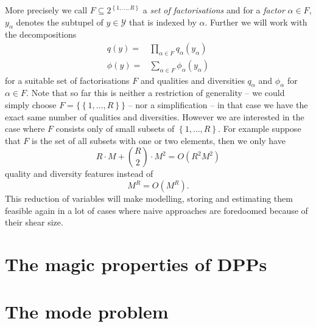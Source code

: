 More precisely we call \(F\subseteq 2^{\left\{ 1, \dots, R\right\}}\) a \emph{set of factorisations} and for a \emph{factor} \(\alpha\in F\), \(y_\alpha\) denotes the subtupel of \(y\in\mathcal Y\) that is indexed by \(\alpha\). Further we will work with the decompositions
\begin{equation}
\begin{split}
q(y) = & \prod_{\alpha\in F}q_\alpha(y_\alpha) \\
\phi(y) = & \sum_{\alpha\in F} \phi_\alpha(y_\alpha)
\end{split}
\end{equation}
for a suitable set of factorisations \(F\) and qualities and diversities \(q_\alpha\) and \(\phi_\alpha\) for \(\alpha\in F\). Note that so far this is neither a restriction of generality -- we could simply choose \(F = \big\{\!\left\{ 1, \dots, R\right\}\!\big\}\) -- nor a simplification -- in that case we have the exact same number of qualities and diversities. However we are interested in the case where \(F\) consists only of small subsets of \(\left\{ 1, \dots, R\right\}\). For example suppose that \(F\) is the set of all subsets with one or two elements, then we only have
\[R\cdot M + \binom{R}{2} \cdot M^2 = O(R^2M^2)\]
quality and diversity features instead of
\[M^R = O(M^R).\]
This reduction of variables will make modelling, storing and estimating them feasible again in a lot of cases where naive approaches are foredoomed because of their shear size.

\section{The magic properties of DPPs}

\section{The mode problem}